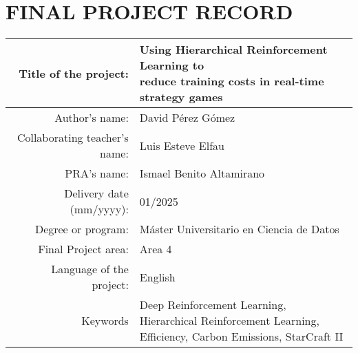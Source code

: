 \chapter*{FINAL PROJECT RECORD}

\begin{table}[ht]
\centering{}
\renewcommand{\arraystretch}{2}
\begin{tabular}{r | l}
\hline
Title of the project: & \makecell[cl]{Using Hierarchical Reinforcement Learning to\\reduce training costs in real-time strategy games}\\
\hline
Author's name: & David Pérez Gómez\\
\hline
Collaborating teacher's name: & Luis Esteve Elfau\\
\hline
PRA's name: & Ismael Benito Altamirano\\
\hline
Delivery date (mm/yyyy): & 01/2025\\
\hline
Degree or program: & Máster Universitario en Ciencia de Datos\\
\hline
Final Project area: & Area 4\\
\hline
Language of the project: & English\\
\hline
Keywords & \makecell[cl]{Deep Reinforcement Learning,\\ Hierarchical Reinforcement Learning,\\ Efficiency, Carbon Emissions, StarCraft II\\}\\
\hline
\end{tabular}
\end{table}